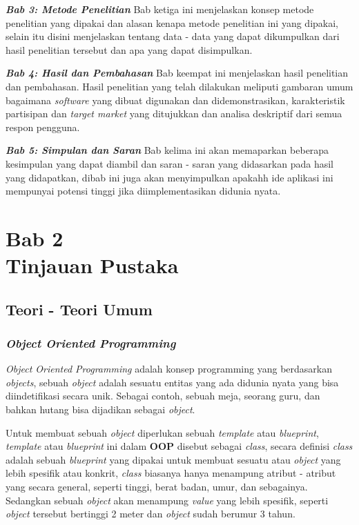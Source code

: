 \documentclass[a4paper]{article}
\newcommand{\bab}[2]{%
    \addtocounter{section}{1}%
    \setcounter{subsection}{0}
    \setcounter{subsubsection}{0}
    \setcounter{figure}{0}
    \setcounter{table}{0}
    \section*{#1\\#2}%
    \addcontentsline{toc}{section}{\protect\numberline{}#1 #2}%
}
\newcommand{\subbab}[1]{%
    \subsection{#1}%
    \setcounter{figure}{0}
    \setcounter{table}{0}
}
\newcommand{\subsubbab}[1]{%
    \subsubsection{#1}%
}
\begin{document}
\textit{\textbf{Bab 3: Metode Penelitian}}\newline
Bab ketiga ini menjelaskan konsep metode penelitian yang dipakai dan alasan kenapa metode penelitian ini yang dipakai, selain itu disini menjelaskan tentang data - data yang dapat dikumpulkan dari hasil penelitian tersebut dan apa yang dapat disimpulkan.

\textit{\textbf{Bab 4: Hasil dan Pembahasan}}\newline
Bab keempat ini menjelaskan hasil penelitian dan pembahasan. Hasil penelitian yang telah dilakukan meliputi gambaran umum bagaimana \textit{software} yang dibuat digunakan dan didemonstrasikan, karakteristik partisipan dan \textit{target market} yang ditujukkan dan analisa deskriptif dari semua respon pengguna.

\textit{\textbf{Bab 5: Simpulan dan Saran}}\newline
Bab kelima ini akan memaparkan beberapa kesimpulan yang dapat diambil dan saran - saran yang didasarkan pada hasil yang didapatkan, dibab ini juga akan menyimpulkan apakahh ide aplikasi ini mempunyai potensi tinggi jika diimplementasikan didunia nyata.

\newpage
{}
\newpage
\bab{Bab 2}{Tinjauan Pustaka}
\subbab{Teori - Teori Umum}

\subsubbab{\textit{Object Oriented Programming}}
\textit{Object Oriented Programming} adalah konsep programming yang berdasarkan \textit{objects}, sebuah \textit{object} adalah sesuatu entitas yang ada didunia nyata yang bisa diindetifikasi secara unik\autocite[346]{liang_liang_2021}. Sebagai contoh, sebuah meja, seorang guru, dan bahkan hutang bisa dijadikan sebagai \textit{object}.

Untuk membuat sebuah \textit{object} diperlukan sebuah \textit{template} atau \textit{blueprint}, \textit{template} atau \textit{blueprint} ini dalam \textbf{OOP} disebut sebagai \textit{class}, secara definisi \textit{class} adalah sebuah \textit{blueprint} yang dipakai untuk membuat sesuatu atau \textit{object} yang lebih spesifik atau konkrit\autocite{education-erin-oop-2020}, \textit{class} biasanya hanya menampung atribut - atribut yang secara general, seperti tinggi, berat badan, umur, dan sebagainya. Sedangkan sebuah \textit{object} akan menampung \textit{value} yang lebih spesifik, seperti \textit{object} tersebut bertinggi 2 meter dan \textit{object} sudah berumur 3 tahun.
\end{document}
